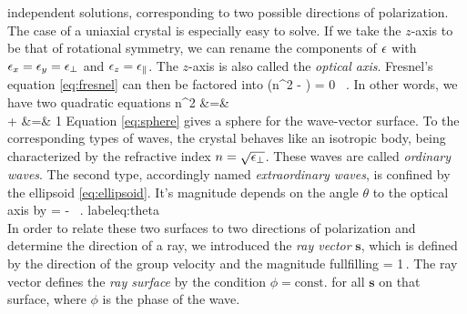 independent solutions, corresponding to two possible directions of polarization. 
The case of a uniaxial crystal is especially easy to solve. If we take the 
$z$-axis to be that of rotational symmetry, we can rename the components of 
$\mathbf{\epsilon}$ with $\epsilon_x = \epsilon_y = \epsilon_\perp$ and $\epsilon_z = \epsilon_\parallel$. 
The $z$-axis is also called the \emph{optical axis}.
Fresnel's equation \eqref{eq:fresnel} can then be factored into
\beq
    \left(n^2 - \frac{\eps_\perp}{\epsn}\right) 
     = 0 \, .
\eeq
In other words, we have two quadratic equations
\bea
    n^2 &=& \frac{\eps_\perp}{\epsn} 
    \label{eq:sphere} \\
     +  &=& 1
    \label{eq:ellipsoid}
\eea
Equation \eqref{eq:sphere} gives a sphere for the wave-vector surface. To the 
corresponding types of waves, the crystal behaves like an isotropic body, being 
characterized by the refractive index $n = \sqrt{\epsilon_\perp}$. These waves are 
called \emph{ordinary waves}. The second type, accordingly named 
\emph{extraordinary waves}, is confined by the ellipsoid \eqref{eq:ellipsoid}. 
It's magnitude depends on 
the angle $\theta$ to the optical axis by 
\beq
     = \frac{\sin^2 \theta}{\eps_\parallel} - 
        \frac{\cos^2 \theta}{\eps_\perp} \, .
    label{eq:theta}
\eeq
\\


In order to relate these two surfaces to two directions of polarization and 
determine the direction of a ray, we introduced the \emph{ray vector} $\mathbf{s}$, 
which is defined by the direction of the group velocity
\beq
    \frac{\partial \omega}{\partial \K}
\eeq
and the magnitude fullfilling 
\beq
     \cdot \N = 1\,.
\eeq
The ray vector defines the \emph{ray surface} by the condition 
$\phi = \mathrm{const.}$ 
for all $\mathbf{s}$ on that surface, where $\phi$ is the phase of the wave. 

